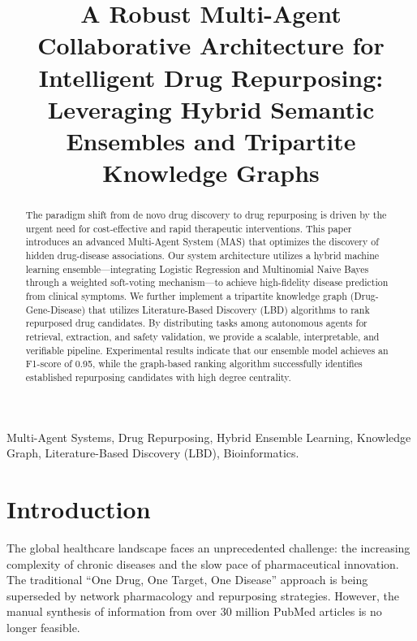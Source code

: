 \documentclass[conference]{IEEEtran}
\begin{document}
\title{A Robust Multi-Agent Collaborative Architecture for Intelligent Drug Repurposing: Leveraging Hybrid Semantic Ensembles and Tripartite Knowledge Graphs}

\author{
}

\maketitle

\begin{abstract}
The paradigm shift from de novo drug discovery to drug repurposing is driven by the urgent need for cost-effective and rapid therapeutic interventions. This paper introduces an advanced Multi-Agent System (MAS) that optimizes the discovery of hidden drug-disease associations. Our system architecture utilizes a hybrid machine learning ensemble—integrating Logistic Regression and Multinomial Naive Bayes through a weighted soft-voting mechanism—to achieve high-fidelity disease prediction from clinical symptoms. We further implement a tripartite knowledge graph (Drug-Gene-Disease) that utilizes Literature-Based Discovery (LBD) algorithms to rank repurposed drug candidates. By distributing tasks among autonomous agents for retrieval, extraction, and safety validation, we provide a scalable, interpretable, and verifiable pipeline. Experimental results indicate that our ensemble model achieves an F1-score of 0.95, while the graph-based ranking algorithm successfully identifies established repurposing candidates with high degree centrality.
\end{abstract}

\begin{IEEEkeywords}
Multi-Agent Systems, Drug Repurposing, Hybrid Ensemble Learning, Knowledge Graph, Literature-Based Discovery (LBD), Bioinformatics.
\end{IEEEkeywords}

\section{Introduction}
The global healthcare landscape faces an unprecedented challenge: the increasing complexity of chronic diseases and the slow pace of pharmaceutical innovation. The traditional ``One Drug, One Target, One Disease'' approach is being superseded by network pharmacology and repurposing strategies. However, the manual synthesis of information from over 30 million PubMed articles is no longer feasible.
\end{document}
